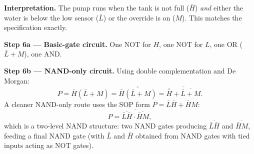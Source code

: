 \documentclass[11pt]{article}
\begin{document}
\begin{exoresolu}
\textbf{Interpretation.} The pump runs when the tank is not full ($\bar{H}$) \emph{and} either the water is below the low sensor ($\bar{L}$) or the override is on ($M$). This matches the specification exactly.

\textbf{Step 6a — Basic-gate circuit.} One NOT for $H$, one NOT for $L$, one OR ($\bar{L}+M$), one AND.

\textbf{Step 6b — NAND-only circuit.} Using double complementation and De Morgan:
\[
P = \bar{H}(\bar{L}+M) = \overline{\overline{\bar{H}(\bar{L}+M)}} = \overline{\overline{\bar{H}} + \overline{\bar{L}+M}}.
\]
A cleaner NAND-only route uses the SOP form $P = \bar{L}\bar{H} + \bar{H}M$:
\[
P = \overline{\overline{\bar{L}\bar{H}} \cdot \overline{\bar{H}M}},
\]
which is a two-level NAND structure: two NAND gates producing $\overline{\bar{L}\bar{H}}$ and $\overline{\bar{H}M}$, feeding a final NAND gate (with $\bar{L}$ and $\bar{H}$ obtained from NAND gates with tied inputs acting as NOT gates).
\end{exoresolu}
\end{document}
